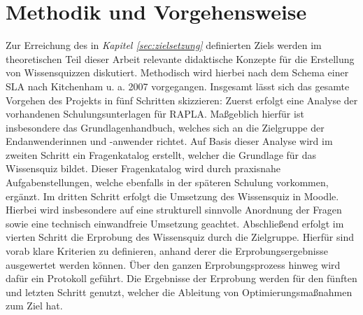 \section{Methodik und Vorgehensweise}
Zur Erreichung des in \textit{Kapitel \ref{sec:zielsetzung}} definierten Ziels werden
im theoretischen Teil dieser Arbeit relevante didaktische Konzepte für die Erstellung von Wissensquizzen
diskutiert. Methodisch wird hierbei nach dem Schema einer \ac{SLA} nach Kitchenham u. a. 2007 vorgegangen.
Insgesamt lässt sich das gesamte Vorgehen des Projekts in fünf Schritten skizzieren:
Zuerst erfolgt eine Analyse der vorhandenen Schulungsunterlagen für \ac{RAPLA}.
Maßgeblich hierfür ist insbesondere das Grundlagenhandbuch, welches sich an die Zielgruppe der
Endanwenderinnen und -anwender richtet. Auf Basis dieser Analyse wird im zweiten Schritt
ein Fragenkatalog erstellt, welcher die Grundlage für das Wissensquiz bildet.
Dieser Fragenkatalog wird durch praxisnahe Aufgabenstellungen, welche ebenfalls
in der späteren Schulung vorkommen, ergänzt. Im dritten Schritt erfolgt die Umsetzung
des Wissensquiz in Moodle. Hierbei wird insbesondere auf eine strukturell
sinnvolle Anordnung der Fragen sowie eine technisch einwandfreie Umsetzung geachtet.
Abschließend erfolgt im vierten Schritt die Erprobung des Wissensquiz durch die Zielgruppe.
Hierfür sind vorab klare Kriterien zu definieren, anhand derer die Erprobungsergebnisse
ausgewertet werden können. Über den ganzen Erprobungsprozess hinweg wird dafür
ein Protokoll geführt. Die Ergebnisse der Erprobung werden für den fünften
und letzten Schritt genutzt, welcher die Ableitung von Optimierungsmaßnahmen
zum Ziel hat.
